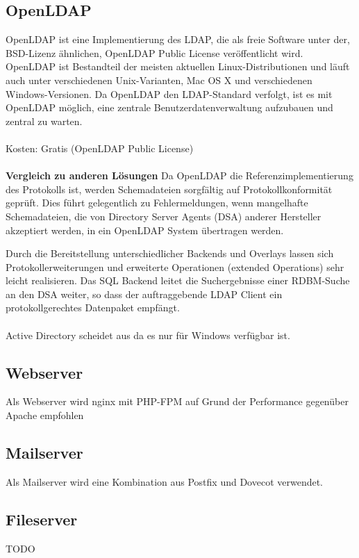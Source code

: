 \documentclass[main.tex]{subfiles}
\begin{document}
\subsection{OpenLDAP}
OpenLDAP ist eine Implementierung des LDAP, die als freie Software unter der, BSD-Lizenz ähnlichen, 
OpenLDAP Public License veröffentlicht wird. OpenLDAP ist Bestandteil der meisten aktuellen
Linux-Distributionen und läuft auch unter verschiedenen Unix-Varianten, Mac OS X und verschiedenen Windows-Versionen.
Da OpenLDAP den LDAP-Standard verfolgt, ist es mit OpenLDAP möglich,
eine zentrale Benutzerdatenverwaltung aufzubauen und zentral zu warten.
\\\\
Kosten: Gratis (OpenLDAP Public License)
\\\\
\textbf{Vergleich zu anderen Lösungen}
Da OpenLDAP die Referenzimplementierung des Protokolls ist, werden Schemadateien sorgfältig
auf Protokollkonformität geprüft. Dies führt gelegentlich zu Fehlermeldungen, wenn mangelhafte Schemadateien,
die von Directory Server Agents (DSA) anderer Hersteller akzeptiert werden, in ein OpenLDAP System übertragen werden.

Durch die Bereitstellung unterschiedlicher Backends und Overlays lassen sich Protokollerweiterungen und
erweiterte Operationen (extended Operations) sehr leicht realisieren. Das SQL Backend leitet die
Suchergebnisse einer RDBM-Suche an den DSA weiter, so dass der auftraggebende LDAP Client ein
protokollgerechtes Datenpaket empfängt.
 \\\\
 Active Directory scheidet aus da es nur für Windows verfügbar ist.
 
 \subsection{Webserver}
 Als Webserver wird nginx mit PHP-FPM auf Grund der Performance gegenüber Apache empfohlen
 
 \subsection{Mailserver}
 Als Mailserver wird eine Kombination aus Postfix und Dovecot verwendet.
 
 \subsection{Fileserver}
 TODO
\end{document}
